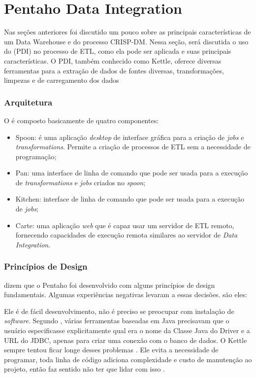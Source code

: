 \section{Pentaho Data Integration}
Nas seções anteriores foi discutido um pouco sobre as principais características de um Data Warehouse e do processo CRISP-DM. Nessa seção, será discutida o uso do \pdi (PDI) no processo de ETL, como ela pode ser aplicada e suas principais características.
O PDI, também conhecido como Kettle, oferece diversas ferramentas para a extração de dados de fontes diversas, transformações, limpezas e de carregamento dos dados
\subsubsection{Arquitetura}
O \pdi é composto basicamente de quatro componentes:
\begin{itemize}
    \item Spoon: é uma aplicação \textit{desktop} de interface gráfica para a criação de \textit{jobs} e \textit{transformations}. Permite a criação de processos de ETL sem a necessidade de programação;
    \item Pan: uma interface de linha de comando que pode ser usada para a execução de \textit{transformations} e \textit{jobs} criados no \textit{spoon};
    \item Kitchen: interface de linha de comando que pode ser usada para a execução de \textit{jobs};
    \item Carte: uma aplicação \textit{web} que é capaz usar um servidor de ETL remoto, fornecendo capacidades de execução remota similares ao servidor de \textit{Data Integration}.
\end{itemize}

\subsubsection{Princípios de Design}
 dizem que o Pentaho foi desenvolvido com alguns princípios de design fundamentais. Algumas experiências negativas levaram a essas decisões. são eles:

Ele é de fácil desenvolvimento, não é preciso se preocupar com instalação de \textit{software}. Segundo , várias ferramentas baseadas em Java precisavam que o usuário especificasse explicitamente qual era o nome da Classe Java do Driver e a URL do JDBC, apenas para criar uma conexão com o banco de dados. O Kettle sempre tentou ficar longe desses problemas \citep{kettle}. Ele evita a necessidade de programar, toda linha de código adiciona complexidade e custo de manutenção ao projeto, então faz sentido não ter que lidar com isso \citep{kettle}.


